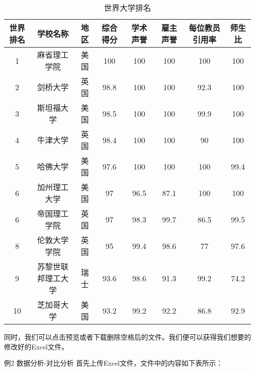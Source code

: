 \begin{table}[h]
    \centering
    \footnotesize
    \begin{tabular}{cccccccc}
        \toprule
        世界排名 & 学校名称 & 地区 & 综合得分 & 学术声誉 & 雇主声誉 & 每位教员引用率 & 师生比 \\
        \midrule
        1  & 麻省理工学院     & 美国 & 100  & 100  & 100  & 100  & 100  \\
        2  & 剑桥大学         & 英国 & 98.8 & 100  & 100  & 92.3 & 100  \\
        3  & 斯坦福大学       & 美国 & 98.5 & 100  & 100  & 99.9 & 100  \\
        4  & 牛津大学         & 英国 & 98.4 & 100  & 100  & 90   & 100  \\
        5  & 哈佛大学         & 美国 & 97.6 & 100  & 100  & 100  & 99.4 \\
        6  & 加州理工大学     & 美国 & 97   & 96.5 & 87.1 & 100  & 100  \\
        6  & 帝国理工学院     & 英国 & 97   & 98.3 & 99.7 & 86.5 & 99.5 \\
        8  & 伦敦大学学院     & 英国 & 95   & 99.4 & 98.6 & 77   & 97.6 \\
        9  & 苏黎世联邦理工大学 & 瑞士 & 93.6 & 98.6 & 91.3 & 99.2 & 74.2 \\
        10 & 芝加哥大学       & 美国 & 93.2 & 99.2 & 92.2 & 86.8 & 92.9 \\
        \bottomrule
    \end{tabular}
    \caption{世界大学排名}
    \label{tab:world_ranking2}
\end{table}
\FloatBarrier
同时，我们可以点击预览或者下载删除空格后的文件。我们便可以获得我们想要的修改好的Excel文件。


例2 数据分析-对比分析
首先上传Excel文件，文件中的内容如下表所示：

